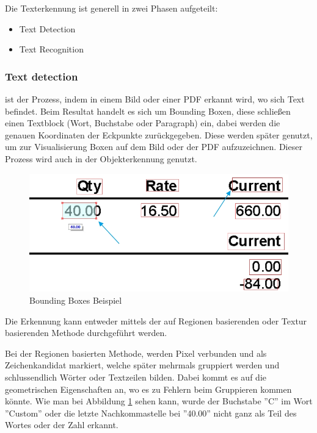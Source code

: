 Die Texterkennung ist generell in zwei Phasen aufgeteilt:

\begin{itemize}
    \item Text Detection
    \item Text Recognition
\end{itemize}

\subsubsection{Text detection} ist der Prozess, indem in einem Bild oder einer PDF erkannt wird, wo sich Text befindet. Beim Resultat handelt es sich um Bounding Boxen, diese schließen einen Textblock (Wort, Buchstabe oder Paragraph) ein, dabei werden die genauen Koordinaten der Eckpunkte zurückgegeben. Diese werden später genutzt, um zur Visualisierung Boxen auf dem Bild oder der PDF aufzuzeichnen. Dieser Prozess wird auch in der Objekterkennung genutzt.

\begin{figure}[H]
    \includegraphics[scale=0.5]{sections/machine-learning/images/bounding-boxes.png}
    \caption{Bounding Boxes Beispiel}
    \label{fig:bounding-boxes}
\end{figure}

Die Erkennung kann entweder mittels der auf Regionen basierenden oder Textur basierenden Methode durchgeführt werden.

Bei der Regionen basierten Methode, werden Pixel verbunden und als Zeichenkandidat markiert, welche später mehrmals gruppiert werden und schlussendlich Wörter oder Textzeilen bilden. Dabei kommt es auf die geometrischen Eigenschaften an, wo es zu Fehlern beim Gruppieren kommen könnte. Wie man bei Abbildung \ref{fig:bounding-boxes} sehen kann, wurde der Buchstabe ''C'' im Wort ''Custom'' oder die letzte Nachkommastelle bei ''40.00'' nicht ganz als Teil des Wortes oder der Zahl erkannt.

